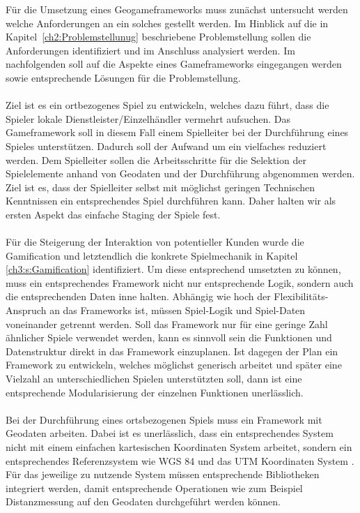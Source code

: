 Für die Umsetzung eines Geogameframeworks muss zunächst untersucht werden welche Anforderungen an ein solches gestellt werden.
Im Hinblick auf die in Kapitel~\ref{ch2:Problemstellunug} beschriebene Problemstellung sollen die Anforderungen  identifiziert und im Anschluss analysiert werden. Im nachfolgenden soll auf die Aspekte eines Gameframeworks eingegangen werden sowie entsprechende Lösungen für die Problemstellung.
\\\\
Ziel ist es ein ortbezogenes Spiel zu entwickeln, welches dazu führt, dass die Spieler lokale Dienstleister/Einzelhändler vermehrt aufsuchen. Das Gameframework soll in diesem Fall einem Spielleiter bei der Durchführung eines Spieles unterstützen. Dadurch soll der Aufwand um ein vielfaches reduziert werden.
Dem Spielleiter sollen die Arbeitsschritte für die Selektion der Spielelemente anhand von Geodaten und der Durchführung abgenommen werden. Ziel ist es, dass der Spielleiter selbst mit möglichst geringen Technischen Kenntnissen ein entsprechendes Spiel durchführen kann. Daher halten wir als ersten Aspekt das einfache Staging der Spiele fest.
\\\\
Für die Steigerung der Interaktion von potentieller Kunden wurde die Gamification und letztendlich die konkrete Spielmechanik in Kapitel \ref{ch3:s:Gamification} identifiziert. Um diese entsprechend umsetzten zu können, muss ein entsprechendes Framework nicht nur entsprechende Logik, sondern auch die entsprechenden Daten inne halten. Abhängig wie hoch der Flexibilitäts-Anspruch an das Frameworks ist, müssen Spiel-Logik und Spiel-Daten voneinander getrennt werden. Soll das Framework nur für eine geringe Zahl ähnlicher Spiele verwendet werden, kann es sinnvoll sein die Funktionen und Datenstruktur direkt in das Framework einzuplanen. Ist dagegen der Plan ein Framework zu entwickeln, welches möglichst generisch arbeitet und später eine Vielzahl an unterschiedlichen Spielen unterstützten soll, dann ist eine entsprechende Modularisierung der einzelnen Funktionen unerlässlich.
\\\\
Bei der Durchführung eines ortsbezogenen Spiels muss ein Framework mit Geodaten arbeiten.
Dabei ist es unerlässlich, dass ein entsprechendes System nicht mit einem einfachen kartesischen Koordinaten System arbeitet, sondern ein entsprechendes Referenzsystem wie WGS 84 \cite{Grafarend.1998} und das UTM Koordinaten System \cite{Grafarend.1995}.
Für das jeweilige zu nutzende System müssen entsprechende Bibliotheken integriert werden, damit entsprechende Operationen wie zum Beispiel Distanzmessung auf den Geodaten durchgeführt werden können.
